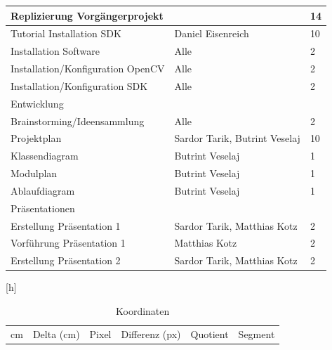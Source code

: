 \begin{appendix}
\begin{table}[h]
\begin{center}
\begin{tabular}[]{| l | l | l |}
                    \hline

                    Replizierung Vorgängerprojekt     &                   & 14 \\
                    \hline
                    Tutorial Installation SDK         & Daniel Eisenreich & 10 \\
                    Installation Software             & Alle              & 2 \\
                    Installation/Konfiguration OpenCV & Alle              & 2 \\
                    Installation/Konfiguration SDK    & Alle              & 2 \\

                    \hline

                    Entwicklung                 &                               & \\
                    \hline
                    Brainstorming/Ideensammlung & Alle                          & 2 \\
                    Projektplan                 & Sardor Tarik, Butrint Veselaj & 10 \\
                    Klassendiagram              & Butrint Veselaj               & 1 \\
                    Modulplan                   & Butrint Veselaj               & 1 \\
                    Ablaufdiagram               & Butrint Veselaj               & 1 \\

                    \hline

                    Präsentationen            &                             & \\
                    \hline
                    Erstellung Präsentation 1 & Sardor Tarik, Matthias Kotz & 2 \\
                    Vorführung Präsentation 1 & Matthias Kotz               & 2 \\
                    Erstellung Präsentation 2 & Sardor Tarik, Matthias Kotz & 2 \\
                \end{tabular}
            \end{center}
        \end{table}[h]

        \begin{table}[h]
            \caption{Koordinaten}
            \label{tbl:cmtbl}
            \begin{center}
                \begin{tabular}[]{| l | l | l | l | l | l |}
                    \hline
                    cm      & Delta (cm) & Pixel & Differenz (px) & Quotient     & Segment \\


\end{tabular}
\end{center}
\end{table}
\end{appendix}

